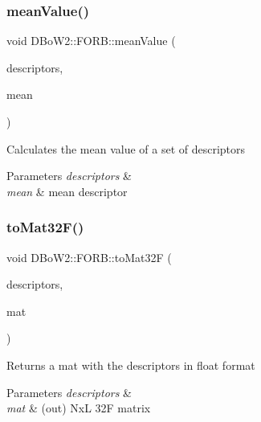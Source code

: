 \subsubsection{\texorpdfstring{mean\+Value()}{meanValue()}}
{\footnotesize\ttfamily void D\+Bo\+W2\+::\+F\+O\+R\+B\+::mean\+Value (\begin{DoxyParamCaption}\item[{const std\+::vector$<$ \mbox{\hyperlink{class_d_bo_w2_1_1_f_class_a9c94e662003f61413fd542d67b45c3a9}{p\+Descriptor}} $>$ \&}]{descriptors,  }\item[{\mbox{\hyperlink{class_d_bo_w2_1_1_f_o_r_b_aef9b966d0293836fab9f55f1799ce0ed}{T\+Descriptor}} \&}]{mean }\end{DoxyParamCaption})\hspace{0.3cm}{\ttfamily [static]}}

Calculates the mean value of a set of descriptors 
\begin{DoxyParams}{Parameters}
{\em descriptors} & \\
\hline
{\em mean} & mean descriptor \\
\hline
\end{DoxyParams}
\mbox{\label{class_d_bo_w2_1_1_f_o_r_b_a67b90eaed01dd54e380237c78886635f}} 
\subsubsection{\texorpdfstring{to\+Mat32\+F()}{toMat32F()}}
{\footnotesize\ttfamily void D\+Bo\+W2\+::\+F\+O\+R\+B\+::to\+Mat32F (\begin{DoxyParamCaption}\item[{const std\+::vector$<$ \mbox{\hyperlink{class_d_bo_w2_1_1_f_o_r_b_aef9b966d0293836fab9f55f1799ce0ed}{T\+Descriptor}} $>$ \&}]{descriptors,  }\item[{cv\+::\+Mat \&}]{mat }\end{DoxyParamCaption})\hspace{0.3cm}{\ttfamily [static]}}

Returns a mat with the descriptors in float format 
\begin{DoxyParams}{Parameters}
{\em descriptors} & \\
\hline
{\em mat} & (out) NxL 32F matrix \\
\hline
\end{DoxyParams}
\mbox{\label{class_d_bo_w2_1_1_f_o_r_b_af0a9e2ea44336f2975a7f3324777330c}} 

